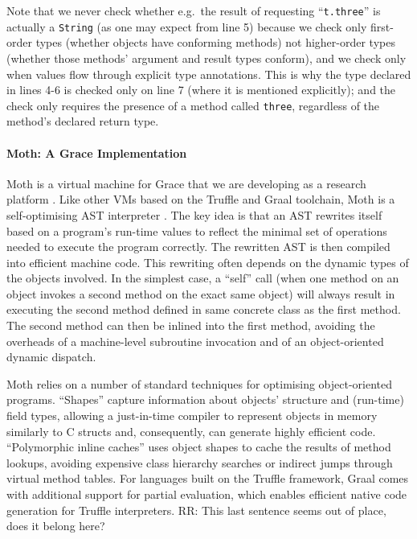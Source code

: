 \documentclass[sigplan,10pt,review,screen]{acmart}\settopmatter{printfolios=true}
\newcommand{\code}[1]{\texttt{#1}}
\newcommand{\RR}[1]{{\color{red}RR: #1}}
\begin{document}
Note that we never check
whether e.g.\ the result of requesting ``\code{t.three}'' is actually
a \code{String} (as one may expect from line 5) because we check
only first-order types (whether objects have conforming methods) not higher-order
types (whether those methods' argument and result types conform), and
we check only when values flow through explicit type annotations.
This is why the type declared in lines 4-6 is checked only on line 7
(where it is mentioned explicitly); and the check only requires the
presence of a method called \code{three}, regardless of the method's
declared return type.

\paragraph{Moth: A Grace Implementation}
Moth is a virtual machine for Grace that we are developing as a
research platform \cite{roberts-and-co-ecoop-2019}. Like other VMs
based on the Truffle and Graal toolchain, Moth is a self-optimising
AST interpreter \cite{Wurthinger:2012:SelfOptAST}. 
The key idea is that an AST rewrites itself based on a program's run-time values
to reflect the minimal set of operations needed to execute the program
correctly. The rewritten AST is then compiled into efficient machine
code. This rewriting often depends on the dynamic types of the
objects involved. In the simplest case, a ``self'' call (when one method
on an object invokes a second method on the exact same object) will
always result in executing the second method defined in same concrete
class as the first method. The second method can then be inlined into
the first method, avoiding the overheads of a machine-level subroutine
invocation and of an object-oriented dynamic dispatch.


Moth relies on a number of standard techniques for optimising
object-oriented programs.
``Shapes'' \citep{woss2014object} capture information about objects'
structure and (run-time) 
field types, allowing a just-in-time compiler to
represent objects in memory similarly to C structs and, consequently,
can generate highly efficient code.
``Polymorphic inline caches''
\citep{Hoelzle:91:PIC} uses object shapes to cache the results of
method lookups, avoiding expensive class hierarchy searches or
indirect jumps through virtual method tables. 
For languages built on the Truffle framework,
Graal comes with  additional support for partial evaluation,
which enables efficient native code generation for
Truffle interpreters\citep{Wurthinger:2017:PPE}.
\RR{This last sentence seems out of place, does it belong here?}
\end{document}
